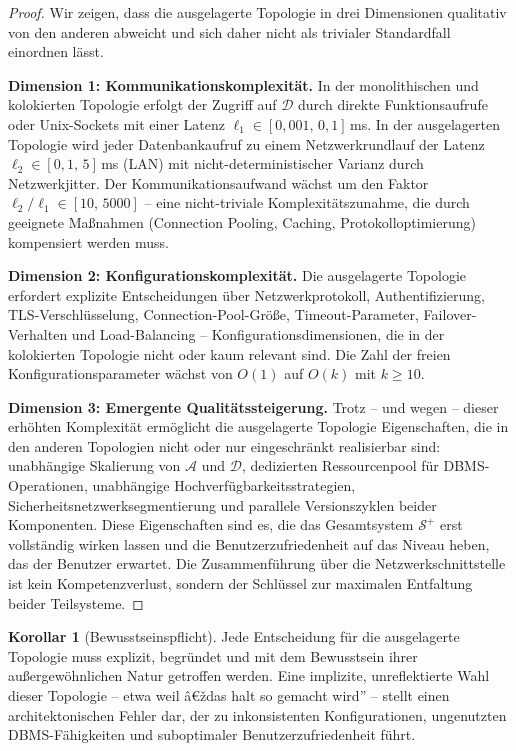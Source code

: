 ﻿\documentclass[a4paper,12pt]{article}
\theoremstyle{definition}
\newtheorem{korollar}{Korollar}
\begin{document}
\begin{proof}
Wir zeigen, dass die ausgelagerte Topologie in drei Dimensionen qualitativ von den anderen abweicht und sich daher nicht als trivialer Standardfall einordnen lässt.

\textbf{Dimension 1: Kommunikationskomplexität.}
In der monolithischen und kolokierten Topologie erfolgt der Zugriff auf $\mathcal{D}$ durch direkte Funktionsaufrufe oder Unix-Sockets mit einer Latenz $\ell_1 \in [0{,}001,\, 0{,}1]$\,ms. In der ausgelagerten Topologie wird jeder Datenbankaufruf zu einem Netzwerkrundlauf der Latenz $\ell_2 \in [0{,}1,\, 5]$\,ms (LAN) mit nicht-deterministischer Varianz durch Netzwerkjitter. Der Kommunikationsaufwand wächst um den Faktor $\ell_2 / \ell_1 \in [10,\, 5000]$ -- eine nicht-triviale Komplexitätszunahme, die durch geeignete Maßnahmen (Connection Pooling, Caching, Protokolloptimierung) kompensiert werden muss.

\textbf{Dimension 2: Konfigurationskomplexität.}
Die ausgelagerte Topologie erfordert explizite Entscheidungen über Netzwerkprotokoll, Authentifizierung, TLS-Verschlüsselung, Connection-Pool-Größe, Timeout-Parameter, Failover-Verhalten und Load-Balancing -- Konfigurationsdimensionen, die in der kolokierten Topologie nicht oder kaum relevant sind. Die Zahl der freien Konfigurationsparameter wächst von $O(1)$ auf $O(k)$ mit $k \geq 10$.

\textbf{Dimension 3: Emergente Qualitätssteigerung.}
Trotz -- und wegen -- dieser erhöhten Komplexität ermöglicht die ausgelagerte Topologie Eigenschaften, die in den anderen Topologien nicht oder nur eingeschränkt realisierbar sind: unabhängige Skalierung von $\mathcal{A}$ und $\mathcal{D}$, dedizierten Ressourcenpool für DBMS-Operationen, unabhängige Hochverfügbarkeitsstrategien, Sicherheitsnetzwerksegmentierung und parallele Versionszyklen beider Komponenten. Diese Eigenschaften sind es, die das Gesamtsystem $\mathcal{S}^+$ erst vollständig wirken lassen und die Benutzerzufriedenheit auf das Niveau heben, das der Benutzer erwartet. Die Zusammenführung über die Netzwerkschnittstelle ist kein Kompetenzverlust, sondern der Schlüssel zur maximalen Entfaltung beider Teilsysteme.
\end{proof}

\begin{korollar}[Bewusstseinspflicht]
\label{kor:bewusstsein}
Jede Entscheidung für die ausgelagerte Topologie muss explizit, begründet und mit dem Bewusstsein ihrer außergewöhnlichen Natur getroffen werden. Eine implizite, unreflektierte Wahl dieser Topologie -- etwa weil â€ždas halt so gemacht wird'' -- stellt einen architektonischen Fehler dar, der zu inkonsistenten Konfigurationen, ungenutzten DBMS-Fähigkeiten und suboptimaler Benutzerzufriedenheit führt.
\end{korollar}
\end{document}
